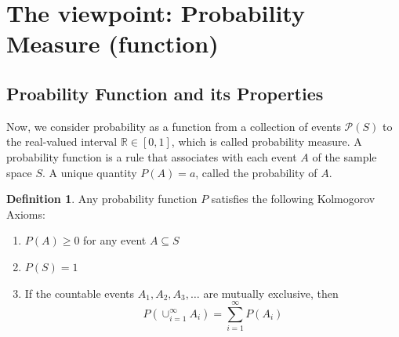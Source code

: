 \documentclass[twoside]{article}
\theoremstyle{definition}
\newtheorem{definition}{Definition}[section]
\theoremstyle{remark}
\begin{document}
\section{The viewpoint: Probability Measure (function)}

\subsection{Proability Function and its Properties}
Now, we consider probability as a function from a collection of events $\mathcal{P}(S)$
to the real-valued interval $\mathbb{R} \in [0, 1]$, which is called probability measure.
A probability function is a rule that associates with each event $A$ of the
sample space $S$. A unique quantity $P(A) = a$, called the probability of $A$.

\begin{definition}
  Any probability function $P$ satisfies the following Kolmogorov Axioms:
  \begin{enumerate}
    \item $P(A) \geq 0$ for any event $A \subseteq S$
    \item $P(S) = 1$
    \item If the countable events $A_1, A_2, A_3, \ldots$ are mutually exclusive,
          then
          $$
          P(\cup_{i=1}^{\infty} A_i) = \sum_{i=1}^{\infty} P(A_i)
          $$
  \end{enumerate}
\end{definition}
\end{document}
